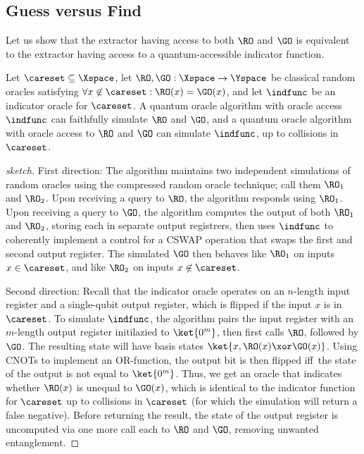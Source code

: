   \subsection{Guess versus Find}
    Let us show that the extractor having access to both $\RO$ and $\GO$ is
      equivalent to the extractor having access to a quantum-accessible
      indicator function.
    
    \begin{lemma}
      Let $\careset \subseteq \Xspace$, let $\RO, \GO: \Xspace \to \Yspace$
      be classical random oracles satisfying $\forall x \not\in \careset: \RO(x) =
      \GO(x)$, and let $\indfunc$ be an indicator oracle for $\careset$. 
      A quantum oracle algorithm with oracle access $\indfunc$ can
      faithfully simulate $\RO$ and $\GO$, and a quantum oracle algorithm with
      oracle access to $\RO$ and $\GO$ can simulate $\indfunc$, up to collisions in
      $\careset$.
    \end{lemma}

    \begin{proof}[sketch]
      First direction: The algorithm maintains two independent simulations of
      random oracles using the compressed random oracle technique; call them
      $\RO_1$ and $\RO_2$. Upon receiving a query to $\RO$, the algorithm
      responds using $\RO_1$. Upon receiving a query to $\GO$, the algorithm
      computes the output of both $\RO_1$ and $\RO_2$, storing each in separate output
      registrers, then uses $\indfunc$ to coherently implement a control for a
      CSWAP operation that swaps the first and second output register. The simulated
      $\GO$ then behaves like $\RO_1$ on inputs $x \in \careset$, and like
      $\RO_2$ on inputs $x \not\in \careset$.

      Second direction: Recall that the indicator oracle operates on an $n$-length
      input register and a single-qubit output register, which is flipped if the
      input $x$ is in $\careset$. To simulate $\indfunc$,
      the algorithm pairs the input register with an $m$-length output register
      initilazied to $\ket{0^m}$, then first calls $\RO$, followed by $\GO$. The
      resulting state will have basis states $\ket{x, \RO(x) \xor \GO(x)}$.
      Using CNOTs to implement an OR-function, the output bit is then flipped
      iff the state of the output is not equal to $\ket{0^m}$. Thus, we get an
      oracle that indicates whether $\RO(x)$ is unequal to $\GO(x)$, which is
      identical to the indicator function for $\careset$ up to collisions in
      $\careset$ (for which the simulation will return a false negative).
      Before returning the result, the state of the output register is
      uncomputed via one more call each to $\RO$ and $\GO$, removing 
      unwanted entanglement.
    \end{proof}

